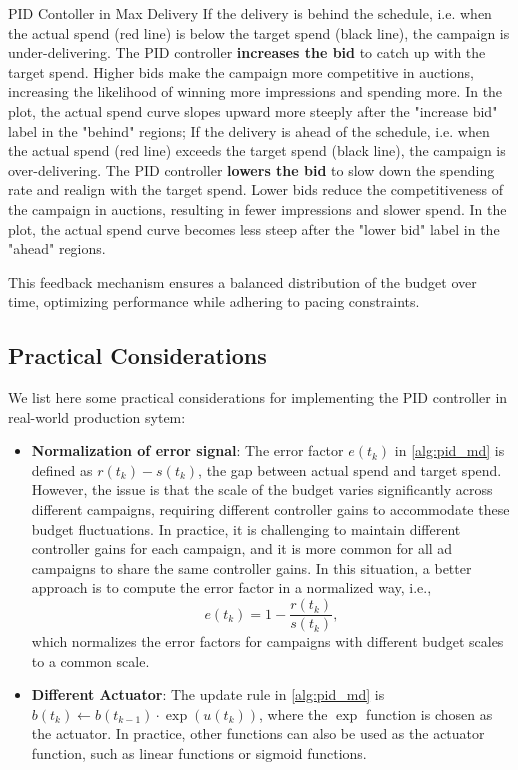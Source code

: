 \documentclass[../main.tex]{subfiles}
\begin{document}
\begin{section}{PID Contoller in Max Delivery}
	If the delivery is behind the schedule, i.e. when the actual spend (red line) is below the target spend (black line), the campaign is under-delivering. The PID controller \textbf{increases the bid} to catch up with the target spend. Higher bids make the campaign more competitive in auctions, increasing the likelihood of winning more impressions and spending more. In the plot, the actual spend curve slopes upward more steeply after the "increase bid" label in the "behind" regions; If the delivery is ahead of the schedule, i.e. when the actual spend (red line) exceeds the target spend (black line), the campaign is over-delivering. The PID controller \textbf{lowers the bid} to slow down the spending rate and realign with the target spend. Lower bids reduce the competitiveness of the campaign in auctions, resulting in fewer impressions and slower spend. In the plot, the actual spend curve becomes less steep after the "lower bid" label in the "ahead" regions.
	
	This feedback mechanism ensures a balanced distribution of the budget over time, optimizing performance while adhering to pacing constraints.
	
	\subsection*{Practical Considerations}
	We list here some practical considerations for implementing the PID controller in real-world production sytem:
	\begin{itemize}
		\item \textbf{Normalization of error signal}: The error factor \(e(t_k)\) in \autoref{alg:pid_md} is defined as \(r(t_k) - s(t_k)\), the gap between actual spend and target spend. However, the issue is that the scale of the budget varies significantly across different campaigns, requiring different controller gains to accommodate these budget fluctuations. In practice, it is challenging to maintain different controller gains for each campaign, and it is more common for all ad campaigns to share the same controller gains. In this situation, a better approach is to compute the error factor in a normalized way, i.e.,
		\[
		e(t_k) = 1 - \frac{r(t_k)}{s(t_k)},
		\]
		which normalizes the error factors for campaigns with different budget scales to a common scale.
		\item \textbf{Different Actuator}: The update rule in \autoref{alg:pid_md} is \(b(t_k) \gets b(t_{k-1}) \cdot \exp(u(t_k))\), where the \(\exp\) function is chosen as the actuator. In practice, other functions can also be used as the actuator function, such as linear functions or sigmoid functions.
		

\end{itemize}
\end{section}
\end{document}
